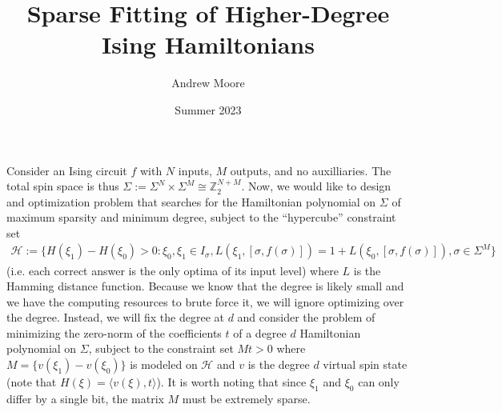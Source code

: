 \documentclass{article}
\title{Sparse Fitting of Higher-Degree Ising Hamiltonians}
\author{Andrew Moore}
\date{Summer 2023}
\newcommand{\Z}{{\mathbb{Z}}}
\begin{document}
\maketitle

Consider an Ising circuit $f$ with $N$ inputs, $M$ outputs, and no auxilliaries. The total spin space is thus $\Sigma := \Sigma^N \times \Sigma^M \cong \Z_2^{N+M}$. Now, we would like to design and optimization problem that searches for the Hamiltonian polynomial on $\Sigma$ of maximum sparsity and minimum degree, subject to the ``hypercube'' constraint set 
\begin{align}
		\mathcal{H} := \{H(\xi_1) - H(\xi_0) > 0 : \xi_0, \xi_1 \in I_\sigma, L(\xi_1, [\sigma, f(\sigma)]) = 1+L(\xi_0, [\sigma, f(\sigma)]), \sigma \in \Sigma^M\}
\end{align}
(i.e. each correct answer is the only optima of its input level) where $L$ is the Hamming distance function. Because we know that the degree is likely small and we have the computing resources to brute force it, we will ignore optimizing over the degree. Instead, we will fix the degree at $d$ and consider the problem of minimizing the zero-norm of the coefficients $t$ of a degree $d$ Hamiltonian polynomial on $\Sigma$, subject to the constraint set $Mt > 0$ where $M = \{v(\xi_1) - v(\xi_0)\}$ is modeled on $\mathcal{H}$ and $v$ is the degree $d$ virtual spin state (note that $H(\xi) = \langle v(\xi), t\rangle$). It is worth noting that since $\xi_1$ and $\xi_0$ can only differ by a single bit, the matrix $M$ must be extremely sparse. 
\end{document}
